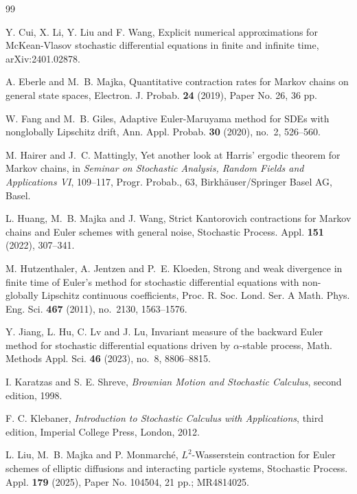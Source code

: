 \documentclass[aap]{imsart}
\theoremstyle{plain}
\theoremstyle{definition}
\begin{document}
\begin{thebibliography}{99}
				
				\label{Cui YP} Y.  Cui, X.  Li, Y. Liu and F. Wang, Explicit numerical approximations for McKean-Vlasov stochastic differential equations in finite and infinite time, arXiv:2401.02878.	
				
				\label{EJP} A. Eberle and M.~B. Majka, Quantitative contraction rates for Markov chains on general state spaces, Electron. J. Probab. {\bf 24} (2019), Paper No. 26, 36 pp.
				
				\label{W.F} W. Fang and M.~B. Giles, Adaptive Euler-Maruyama method for SDEs with nonglobally Lipschitz drift, Ann. Appl. Probab. {\bf 30} (2020), no.~2, 526--560.
		
				
				 \label{Hairer} M. Hairer and J.~C. Mattingly, Yet another look at Harris' ergodic theorem for Markov chains, in {\it Seminar on Stochastic Analysis, Random Fields and Applications VI}, 109--117, Progr. Probab., 63, Birkh\"auser/Springer Basel AG, Basel.
				
				\label{Huang} L. Huang, M.~B. Majka and J. Wang, Strict Kantorovich contractions for Markov chains and Euler schemes with general noise, Stochastic Process. Appl. {\bf 151} (2022), 307--341.
				
				\label{Hutzenthaler} M. Hutzenthaler, A. Jentzen and P.~E. Kloeden, Strong and weak divergence in finite time of Euler's method for stochastic differential equations with non-globally Lipschitz continuous coefficients, Proc. R. Soc. Lond. Ser. A Math. Phys. Eng. Sci. {\bf 467} (2011), no.~2130, 1563--1576.
				
				\label{JiangY} Y. Jiang, L. Hu, C. Lv and J. Lu, Invariant measure of the backward Euler method for stochastic differential equations driven by $\alpha$-stable process, Math. Methods Appl. Sci. {\bf 46} (2023), no.~8, 8806--8815.
				
				\label{BMSC} I. Karatzas and S. E. Shreve, {\it Brownian Motion and Stochastic Calculus}, second edition, 1998.
				
				\label{FC}F. C. Klebaner, {\it Introduction to Stochastic Calculus with Applications}, third edition, Imperial College Press, London, 2012.
				
				\label{2025SPA} L. Liu, M.~B. Majka and P. Monmarch\'e, $L^2$-Wasserstein contraction for Euler schemes of elliptic diffusions and interacting particle systems, Stochastic Process. Appl. {\bf 179} (2025), Paper No. 104504, 21 pp.; MR4814025.
				

\end{thebibliography}
\end{document}
